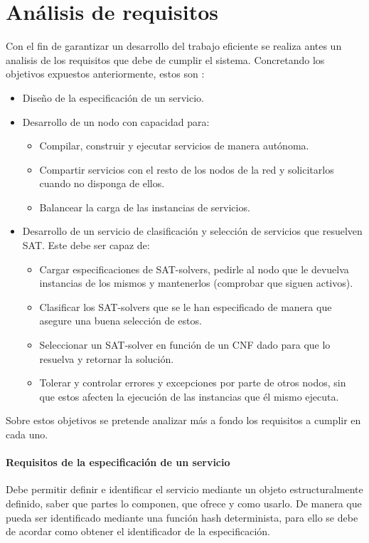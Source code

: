 \documentclass[11pt]{article}
\begin{document}
	\section{Análisis de requisitos}
		Con el fin de garantizar un desarrollo del trabajo eficiente se realiza antes un analisis de los requisitos que debe de cumplir el sistema.
		Concretando los objetivos expuestos anteriormente, estos son :
		\begin{itemize}
			\item Diseño de la especificación de un servicio.
			\item Desarrollo de un nodo con capacidad para:
			\begin{itemize}
				\item Compilar, construir y ejecutar servicios de manera autónoma.
				\item Compartir servicios con el resto de los nodos de la red y solicitarlos cuando no disponga de ellos.
				\item Balancear la carga de las instancias de servicios.
			\end{itemize}
			\item Desarrollo de un servicio de clasificación y selección de servicios que 
			resuelven SAT. Este debe ser capaz de:
			\begin{itemize}
				\item Cargar especificaciones de SAT-solvers, pedirle al nodo que le devuelva
					instancias de los mismos y mantenerlos (comprobar que siguen activos).
				\item Clasificar los SAT-solvers que se le han especificado de manera que asegure una buena selección de estos.
				\item Seleccionar un SAT-solver en función de un CNF dado para que lo resuelva y retornar la solución.
				\item Tolerar y controlar errores y excepciones por parte de otros nodos, sin que estos afecten la ejecución de las instancias que
					él mismo ejecuta.
			\end{itemize}
		\end{itemize}

		Sobre estos objetivos se pretende analizar más a fondo los requisitos a cumplir en cada uno.
		\paragraph{Requisitos de la especificación de un servicio}
			Debe permitir definir e identificar el servicio mediante un objeto estructuralmente definido, saber que partes lo componen, que ofrece y como usarlo.
			De manera que pueda ser identificado mediante una función hash determinista, para ello se debe de acordar como obtener el identificador de la especificación.
		
\end{document}

